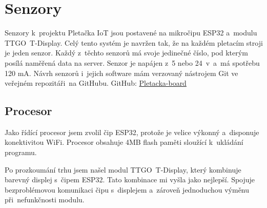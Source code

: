 \chapter{Senzory}

Senzory k~projektu Pletačka IoT jsou postavené na mikročipu ESP32 a~modulu TTGO~T-Display.
Celý tento systém je navržen tak, že na každém pletacím stroji je jeden senzor.
Každý z~těchto senzorů má svoje jedinečné číslo, pod kterým posílá naměřená data na server.
Senzor je napájen z~5 nebo 24~v~a~má spotřebu 120 mA.
Návrh senzorů i~jejich software mám verzovaný nástrojem Git ve veřejném repozitáři~na GitHubu.\newline
GitHub: \href{https://github.com/Pletacka-IoT/Pletacka-board}{Pletacka-board}\cite{PL_BOARD}

\section{Procesor}
Jako řídící procesor jsem zvolil čip ESP32, protože je velice výkonný a~disponuje konektivitou WiFi.
Procesor obsahuje 4MB flash paměti sloužící k~uk\-lá\-dá\-ní programu.

Po prozkoumání trhu jsem našel modul TTGO~T-Display, který kombinuje barevný displej s~čipem ESP32.
Tato kombinace mi vyšla jako nejlepší. 
Spojuje bezproblémovou komunikaci čipu s~displejem a~zároveň jednoduchou výměnu při~nefunkčnosti modulu.


